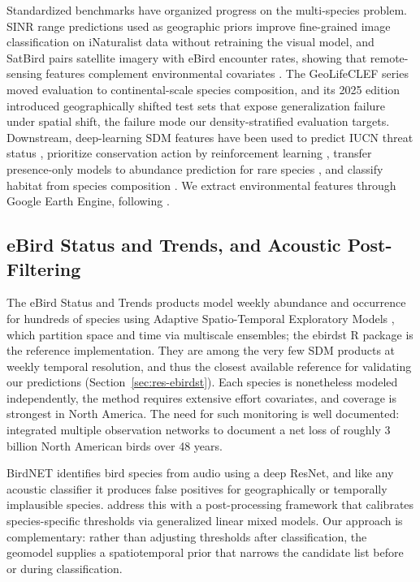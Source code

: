 Standardized benchmarks have organized progress on the multi-species problem. SINR range predictions used as geographic priors improve fine-grained image classification on iNaturalist data \citep{cole2023spatial,vanhorn2021benchmarking} without retraining the visual model, and SatBird pairs satellite imagery with eBird encounter rates, showing that remote-sensing features complement environmental covariates \citep{teng2023satbird}. The GeoLifeCLEF series \citep{botella2025geolifeclef,picek2025lifeclef} moved evaluation to continental-scale species composition, and its 2025 edition \citep{picek2025overview} introduced geographically shifted test sets that expose generalization failure under spatial shift, the failure mode our density-stratified evaluation targets. Downstream, deep-learning SDM features have been used to predict IUCN threat status \citep{estopinan2024extinction}, prioritize conservation action by reinforcement learning \citep{silvestro2022improving}, transfer presence-only models to abundance prediction for rare species \citep{bourel2025abundance}, and classify habitat from species composition \citep{leblanc2024deep}. We extract environmental features through Google Earth Engine, following \citet{crego2022implementation}.

\subsection{eBird Status and Trends, and Acoustic Post-Filtering}
\label{sec:related-ebirdst}

The eBird Status and Trends products model weekly abundance and occurrence for hundreds of species \citep{fink2024ebird,fink2023ebird,fink2022ebird} using Adaptive Spatio-Temporal Exploratory Models \citep{fink2010adastem}, which partition space and time via multiscale ensembles; the ebirdst R package \citep{strimasmackey2023ebirdst} is the reference implementation. They are among the very few SDM products at weekly temporal resolution, and thus the closest available reference for validating our predictions (Section~\ref{sec:res-ebirdst}). Each species is nonetheless modeled independently, the method requires extensive effort covariates, and coverage is strongest in North America. The need for such monitoring is well documented: \citet{rosenberg2019decline} integrated multiple observation networks to document a net loss of roughly 3 billion North American birds over 48 years.

BirdNET \citep{kahl2021birdnet} identifies bird species from audio using a deep ResNet, and like any acoustic classifier it produces false positives for geographically or temporally implausible species. \citet{thompson2025post} address this with a post-processing framework that calibrates species-specific thresholds via generalized linear mixed models. Our approach is complementary: rather than adjusting thresholds after classification, the geomodel supplies a spatiotemporal prior that narrows the candidate list before or during classification.


